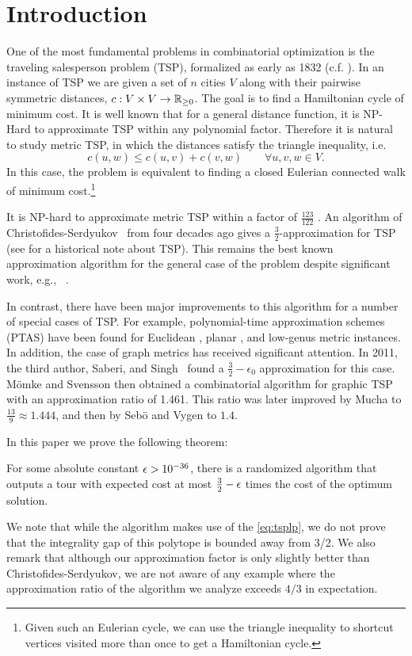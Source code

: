 
\section{Introduction}
One of the most fundamental problems in combinatorial optimization is the traveling salesperson problem (TSP), formalized as early as 1832 (c.f. \cite[Ch 1]{ABCC07}).
In an instance of  TSP we are given a set of $n$ cities $V$ along with their pairwise symmetric distances, $c:V\times V \to\mathbb{R}_{\geq 0}$. The goal is to find a Hamiltonian cycle of minimum cost. It is well known that for a general distance function, it is NP-Hard to approximate TSP within any polynomial factor. Therefore it is natural to study metric TSP, in which the distances satisfy the triangle inequality, i.e. $$c(u,w) \le c(u,v) + c(v,w) \quad\quad \forall u,v,w \in V.$$ In this case, the problem is equivalent to finding a closed Eulerian connected walk of minimum cost.\footnote{Given such an Eulerian cycle, we can use the triangle inequality to shortcut vertices visited more than once to get a Hamiltonian cycle.}

It is NP-hard to approximate metric TSP within a factor of $\frac{123}{122}$ \cite{KLS15}. An algorithm of Christofides-Serdyukov~\cite{Chr76,Ser78} from four decades ago gives a $\frac32$-approximation for TSP (see \cite{VS20} for a historical note about TSP). This remains the best known approximation algorithm for the general case of the problem despite significant work, e.g., ~\cite{Wol80,SW90,BP91,Goe95,CV00,GLS05,BM10,BC11,SWV12, HNR17,HN19, KKO20}. 

In contrast, there have been major improvements to this algorithm for a number of special cases of TSP. For example, polynomial-time approximation schemes (PTAS) have been found for Euclidean \cite{Aro96,Mitchell99}, planar \cite{GKP95, AGKKW98, Kle05},  and low-genus metric \cite{DHM07} instances. 
In addition, the case of graph metrics has received significant attention. In 2011, the third author, Saberi, and Singh~\cite{OSS11} found a $\frac{3}{2} - \epsilon_0$ approximation for this case. M\"omke and Svensson \cite{MS11} then
obtained a combinatorial algorithm for graphic TSP with an approximation ratio of 1.461. This ratio was later improved by Mucha \cite{Muc12} to $\frac{13}{9} \approx 1.444$, and then by Seb\"o and Vygen \cite{SV12} to $1.4$.

In this paper we prove the following theorem:
\begin{theorem}\label{thm:main}
	For some absolute constant ${\epsilon} > 10^{-36}$, there is a randomized algorithm that outputs a tour with expected cost at most $\frac{3}{2}-{\epsilon}$ times the cost of the optimum solution. 
\end{theorem}
We note that while the algorithm makes use of the \ref{eq:tsplp}, we do not prove that the integrality gap of this polytope is bounded away from 3/2. 
We also remark that although our approximation factor is only slightly better than Christofides-Serdyukov, we are not aware of any example where the approximation ratio of the algorithm we analyze exceeds $4/3$ in expectation. 


